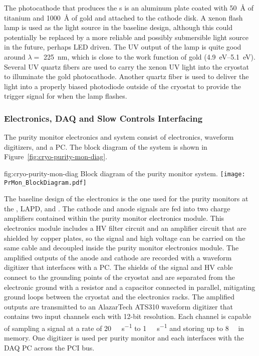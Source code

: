 The photocathode that produces the \phel{}s is an aluminum plate coated with \SI{50}{\angstrom} of titanium and \SI{1000}{\angstrom} of gold and attached to the cathode disk. A xenon flash lamp is used as the light source in the baseline design, although this could potentially be replaced by a more reliable and possibly submersible light source in the future, perhaps LED driven. The UV output of the lamp is quite good around $\lambda=$ \SI{225}{\nano\meter}, which is close to the work function of gold (\SIrange{4.9}{5.1}{\eV}). Several UV quartz fibers are used to carry the xenon UV light into the cryostat to illuminate the gold photocathode.   Another quartz fiber is used to deliver the light into a properly biased photodiode outside of the cryostat to provide the trigger signal for when the lamp flashes. 



\subsubsection{Electronics, DAQ and Slow Controls Interfacing}
The purity monitor electronics and  system consist of  electronics, waveform digitizers, and a  PC.  The block diagram of the system is shown in Figure~\ref{fig:cryo-purity-mon-diag}.


\begin{dunefigure}{fig:cryo-purity-mon-diag}
  {Block diagram of the purity monitor system.}
  \texttt{[image: PrMon\_BlockDiagram.pdf]}
\end{dunefigure}


The baseline design of the  electronics is the one used for the purity monitors at the , LAPD, and \microboone. The cathode and anode signals are fed into two charge amplifiers contained within the purity monitor electronics module.
This electronics module includes a HV filter circuit and an amplifier circuit that are shielded by copper plates, so the signal and high voltage can be carried on the same cable and decoupled inside the purity monitor electronics module.
The amplified outputs of the anode and cathode are recorded with a waveform digitizer that interfaces with a  PC.
The shields of the signal and HV cable connect to the grounding points of the cryostat and are separated from the electronic ground with a resistor and a capacitor connected in parallel, mitigating ground loops between the cryostat and the electronics racks. The amplified outputs are transmitted to an AlazarTech ATS310 waveform digitizer that contains two input channels each with 12-bit resolution. Each channel is capable of sampling a signal at a rate of \SI{20}{\mega\samples\per\second} to \SI{1}{\kilo\samples\per\second} and storing up to \SI{8}{\mega\samples} in memory. One digitizer is used per purity monitor and each interfaces with the DAQ PC across the PCI bus. 

